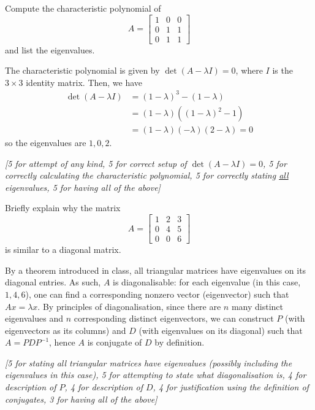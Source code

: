 \documentclass[answers,11pt]{exam}
\theoremstyle{definition}
\DeclareMathOperator{\1}{\mathbbm{1}}
\begin{document}
\begin{questions}
\question[25] Compute the characteristic polynomial of 
\begin{equation*}
A=\begin{bmatrix}
1&0&0\\
0&1&1\\
0&1&1
\end{bmatrix}
\end{equation*}
and list the eigenvalues. 
\addpoints

\begin{solution}
	The characteristic polynomial is given by $\det(A - \lambda I) = 0$, where $I$ is the $3 \times 3$ identity matrix. Then, we have
	\begin{align*}
	\det(A - \lambda I) &= (1-\lambda)^3 - (1-\lambda) \\
	&= (1-\lambda)  ( (1-\lambda)^2 - 1 ) \\
	&= (1-\lambda)(-\lambda)(2-\lambda) = 0
	\end{align*}
	so the eigenvalues are $1,0,2$.
	
	\textit{[5 for attempt of any kind, 5 for correct setup of $\det(A-\lambda I) = 0$, 5 for correctly calculating the characteristic polynomial, 5 for correctly stating \uline{all} eigenvalues, 5 for having all of the above]}
\end{solution}


\question[25] Briefly explain why the matrix 
\begin{equation*}
A=
\begin{bmatrix}
1&2&3\\
0&4&5\\
0&0&6
\end{bmatrix}
\end{equation*}
is similar to a diagonal matrix.
\addpoints

\begin{solution}
	By a theorem introduced in class, all triangular matrices have eigenvalues on its diagonal entries. As such, $A$ is diagonalisable: for each eigenvalue (in this case, $1,4,6$), one can find a corresponding nonzero vector (eigenvector) such that $Ax = \lambda x$. By principles of diagonalisation, since there are $n$ many distinct eigenvalues and $n$ corresponding distinct eigenvectors, we can construct $P$ (with eigenvectors as its columns) and $D$ (with eigenvalues on its diagonal) such that $A = PDP^{-1}$, hence $A$ is conjugate of $D$ by definition.
	
	\textit{[5 for stating all triangular matrices have eigenvalues (possibly including the eigenvalues in this case), 5 for attempting to state what diagonalisation is, 4 for description of $P$, 4 for description of $D$, 4 for justification using the definition of conjugates, 3 for having all of the above]}
\end{solution}

\end{questions}
\end{document}
